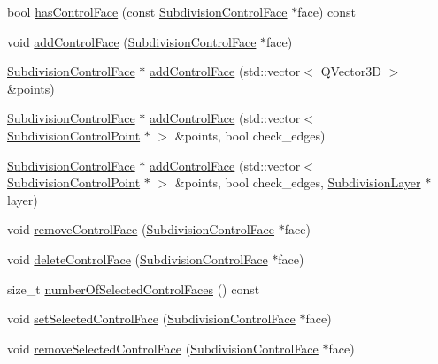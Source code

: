 \begin{DoxyCompactItemize}
\item 
bool \hyperlink{classShipCAD_1_1SubdivisionSurface_a0a8be538bb9da87cb234ba0c33fbbeed}{has\+Control\+Face} (const \hyperlink{classShipCAD_1_1SubdivisionControlFace}{Subdivision\+Control\+Face} $\ast$face) const 
\item 
void \hyperlink{classShipCAD_1_1SubdivisionSurface_abbbb7422a86771451034d2fb7a76bb26}{add\+Control\+Face} (\hyperlink{classShipCAD_1_1SubdivisionControlFace}{Subdivision\+Control\+Face} $\ast$face)
\item 
\hyperlink{classShipCAD_1_1SubdivisionControlFace}{Subdivision\+Control\+Face} $\ast$ \hyperlink{classShipCAD_1_1SubdivisionSurface_a7c83a514f43b868b5fa286f3bc05a41e}{add\+Control\+Face} (std\+::vector$<$ Q\+Vector3D $>$ \&points)
\item 
\hyperlink{classShipCAD_1_1SubdivisionControlFace}{Subdivision\+Control\+Face} $\ast$ \hyperlink{classShipCAD_1_1SubdivisionSurface_a957b534788873921249cd1cc058b9d7e}{add\+Control\+Face} (std\+::vector$<$ \hyperlink{classShipCAD_1_1SubdivisionControlPoint}{Subdivision\+Control\+Point} $\ast$ $>$ \&points, bool check\+\_\+edges)
\item 
\hyperlink{classShipCAD_1_1SubdivisionControlFace}{Subdivision\+Control\+Face} $\ast$ \hyperlink{classShipCAD_1_1SubdivisionSurface_a07d8ca69ed3d45f6e54407fcca8264b2}{add\+Control\+Face} (std\+::vector$<$ \hyperlink{classShipCAD_1_1SubdivisionControlPoint}{Subdivision\+Control\+Point} $\ast$ $>$ \&points, bool check\+\_\+edges, \hyperlink{classShipCAD_1_1SubdivisionLayer}{Subdivision\+Layer} $\ast$layer)
\item 
void \hyperlink{classShipCAD_1_1SubdivisionSurface_a9cce3014753c0b74517b1747a80f6c2c}{remove\+Control\+Face} (\hyperlink{classShipCAD_1_1SubdivisionControlFace}{Subdivision\+Control\+Face} $\ast$face)
\item 
void \hyperlink{classShipCAD_1_1SubdivisionSurface_a394c490440fb20c37abfc2f38d6e50fd}{delete\+Control\+Face} (\hyperlink{classShipCAD_1_1SubdivisionControlFace}{Subdivision\+Control\+Face} $\ast$face)
\item 
size\+\_\+t \hyperlink{classShipCAD_1_1SubdivisionSurface_a71eed6b40f7bdf66144b4e8320f99b37}{number\+Of\+Selected\+Control\+Faces} () const 
\item 
void \hyperlink{classShipCAD_1_1SubdivisionSurface_ab21694a435e0c0dd6139de28ae543254}{set\+Selected\+Control\+Face} (\hyperlink{classShipCAD_1_1SubdivisionControlFace}{Subdivision\+Control\+Face} $\ast$face)
\item 
void \hyperlink{classShipCAD_1_1SubdivisionSurface_aef09d950b0970bd825a984effeee6224}{remove\+Selected\+Control\+Face} (\hyperlink{classShipCAD_1_1SubdivisionControlFace}{Subdivision\+Control\+Face} $\ast$face)

\end{DoxyCompactItemize}
